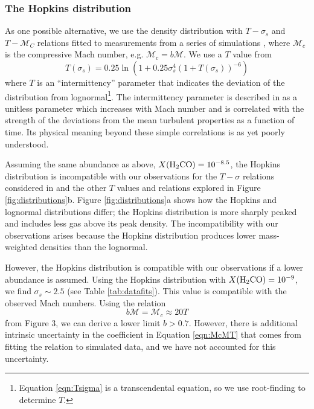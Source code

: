 \subsubsection{The Hopkins distribution}
As one possible alternative, we use the
\citet{Hopkins2013a} density distribution with $T-\sigma_s$ and $T-\mathcal{M}_C$
relations fitted to measurements from a series of simulations
\citep{Kowal2007a,Kritsuk2007a,Schmidt2009a,Federrath2010a,Konstandin2012a,Molina2012a,Federrath2013b}, 
where $\mathcal{M}_c$ is the compressive Mach number, e.g. $\mathcal{M}_c = b \mathcal{M}$.
We use a $T$ value from 
\begin{equation} 
    \label{eqn:Tsigma}
    T(\sigma_s) = 0.25 \ln (1+0.25 \sigma_s^4 \left(1+T(\sigma_s)\right)^{-6})
\end{equation}
where $T$ is an ``intermittency'' parameter that indicates the
deviation of the distribution from lognormal\footnote{Equation \ref{eqn:Tsigma}
is a transcendental equation, so we use root-finding to determine $T$.}.  
The intermittency parameter is described in \citet{Hopkins2013a} as a unitless
parameter which increases with Mach number and is correlated with the strength
of the deviations from the mean turbulent properties as a function of time.
Its physical meaning beyond these simple correlations is as yet poorly understood.

Assuming the same abundance as above, $X(\textrm{H}_2\textrm{CO})=10^{-8.5}$, the Hopkins
distribution is incompatible with our observations for the $T-\sigma$ relations considered
in \citet{Hopkins2013a} and the other $T$ values and relations explored in Figure \ref{fig:distributions}b.
Figure \ref{fig:distributions}a shows how the Hopkins
and lognormal distributions differ; the Hopkins distribution is more sharply
peaked and includes less gas above its peak density.  The incompatibility with
our observations arises because the Hopkins distribution produces lower
mass-weighted densities than the lognormal. 

However, the
Hopkins distribution is compatible with our observations if a lower abundance is assumed.
Using the Hopkins distribution with $X(\textrm{H}_2\textrm{CO})=10^{-9}$, we find
$\sigma_s\sim2.5$ (see Table \ref{tab:datafits}).  This value is compatible
with the observed Mach numbers.  Using the relation 
\begin{equation}
    \label{eqn:McMT}
    b \mathcal{M} = \mathcal{M}_c  \approx 20 T
\end{equation}
from \citet{Hopkins2013a} Figure 3, we can derive a lower limit $b>0.7$.
However, there is additional intrinsic uncertainty in the coefficient in
Equation \ref{eqn:McMT} that comes from fitting the relation to simulated data,
and we have not accounted for this uncertainty.  %

